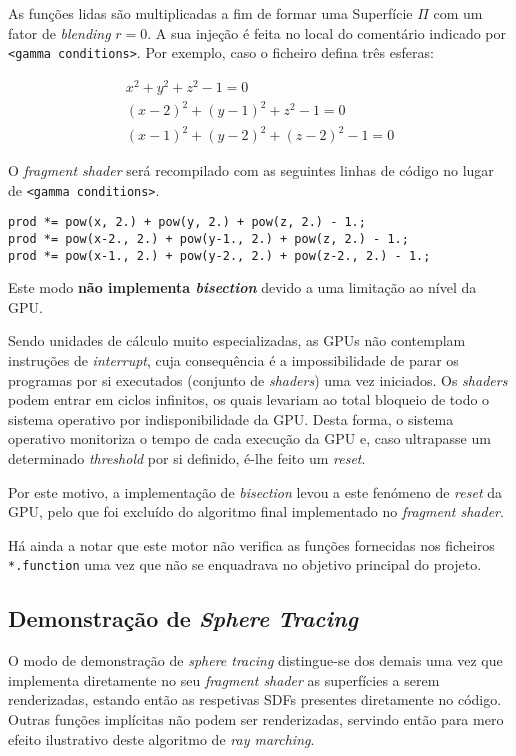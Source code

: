 As funções lidas são multiplicadas a fim de formar uma Superfície $\Pi$ com um fator de \textit{blending} $r = 0$. A sua injeção é feita no local do comentário indicado por \verb|<gamma conditions>|. Por exemplo, caso o ficheiro defina três esferas:

\begin{eqnarray*}
	x^2 + y^2 + z^2 - 1 = 0 \\
	(x-2)^2 + (y-1)^2 + z^2 - 1 = 0 \\
	(x-1)^2 + (y-2)^2 + (z-2)^2 - 1 = 0
\end{eqnarray*}

O \textit{fragment shader} será recompilado com as seguintes linhas de código no lugar de \verb|<gamma conditions>|.

\begin{verbatim}
prod *= pow(x, 2.) + pow(y, 2.) + pow(z, 2.) - 1.;
prod *= pow(x-2., 2.) + pow(y-1., 2.) + pow(z, 2.) - 1.;
prod *= pow(x-1., 2.) + pow(y-2., 2.) + pow(z-2., 2.) - 1.;
\end{verbatim}

Este modo \textbf{não implementa \textit{bisection}} devido a uma limitação ao nível da \acs{GPU}.

Sendo unidades de cálculo muito especializadas, as \acsp{GPU} não contemplam instruções de \textit{interrupt}, cuja consequência é a impossibilidade de parar os programas por si executados (conjunto de \textit{shaders}) uma vez iniciados. Os \textit{shaders} podem entrar em ciclos infinitos, os quais levariam ao total bloqueio de todo o sistema operativo por indisponibilidade da \acs{GPU}. Desta forma, o sistema operativo monitoriza o tempo de cada execução da \acs{GPU} e, caso ultrapasse um determinado \textit{threshold} por si definido, é-lhe feito um \textit{reset}.

Por este motivo, a implementação de \textit{bisection} levou a este fenómeno de \textit{reset} da \acs{GPU}, pelo que foi excluído do algoritmo final implementado no \textit{fragment shader}.

Há ainda a notar que este motor não verifica as funções fornecidas nos ficheiros \verb|*.function| uma vez que não se enquadrava no objetivo principal do projeto.


\subsection{Demonstração de \textit{Sphere Tracing}}
\label{ssec::impl:motor:sphere}

O modo de demonstração de \textit{sphere tracing} distingue-se dos demais uma vez que implementa diretamente no seu \textit{fragment shader} as superfícies a serem renderizadas, estando então as respetivas \acfp{SDF} presentes diretamente no código. Outras funções implícitas não podem ser renderizadas, servindo então para mero efeito ilustrativo deste algoritmo de \textit{ray marching}.


